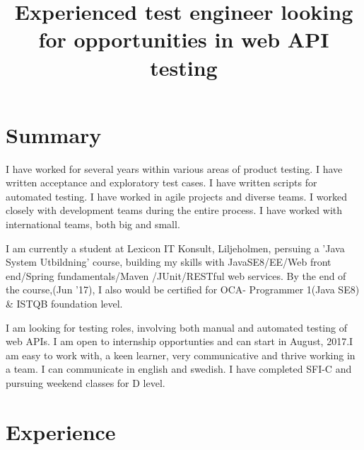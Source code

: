 \documentclass[12pt,a4paper,sans]{moderncv} %
\title{ Experienced test engineer looking for opportunities in web API testing}
\begin{document}
\makecvtitle

\section{Summary}
I have worked for several years within various areas of product testing. I have written acceptance and exploratory test cases. I have written scripts for automated testing. I have
worked in agile projects and diverse teams. I worked closely with development teams during the entire process. I have worked with international teams, both big and small.

\hfill \break
I am currently a student at Lexicon IT Konsult, Liljeholmen, persuing a 'Java System Utbildning' course, building my skills with JavaSE8/EE/Web front end/Spring fundamentals/Maven
/JUnit/RESTful web services. By the end of the course,(Jun '17), I also would be certified for OCA- Programmer 1(Java SE8) \& ISTQB foundation level.

\hfill \break
I am looking for testing roles, involving both manual and automated testing of web APIs. I am open to internship opportunties and can start in August, 2017.I am easy to work with,
a keen learner, very communicative and thrive working in a team. I can communicate in english and swedish.
I have completed SFI-C and pursuing weekend classes for D level.



\section{Experience}

\end{document}
